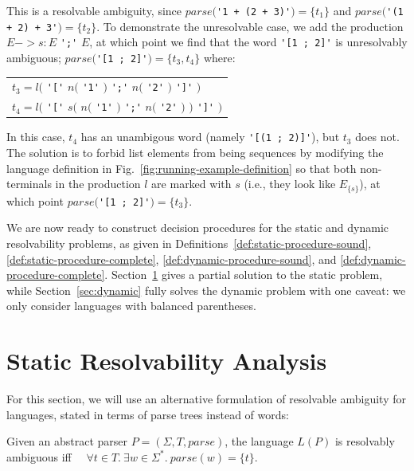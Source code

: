 \documentclass[acmsmall,review,anonymous]{acmart}\settopmatter{printfolios=true,printccs=false,printacmref=false}
\newcommand{\T}{\Sigma} %
\newcommand{\parse}{\mathit{parse}} %
\begin{document}
\noindent This is a resolvable ambiguity, since $\parse($\verb|'1 + (2 + 3)'|$) = \{t_1\}$ and $\parse($\verb|'(1 + 2) + 3'|$) = \{t_2\}$. To demonstrate the unresolvable case, we add the production $E -> s: E$ \verb|';'| $E$, at which point we find that the word \verb|'[1 ; 2]'| is unresolvably ambiguous; $\parse($\verb|'[1 ; 2]'|$) = \{t_3, t_4\}$ where:

\begin{center}
  \begin{tabular}{l}
    $t_3 = l($ \verb|'['| \hphantom{$s($} $n($ \verb|'1'| $)$ \verb|';'| $n($ \verb|'2'| $)$ \hphantom{$)$} \verb|']'| $)$ \\
    $t_4 = l($ \verb|'['| $s($ $n($ \verb|'1'| $)$ \verb|';'| $n($ \verb|'2'| $)$ $)$ \verb|']'| $)$ \\
  \end{tabular}
\end{center}

\noindent In this case, $t_4$ has an unambigous word (namely \verb|'[(1 ; 2)]'|), but $t_3$ does not. The solution is to forbid list elements from being sequences by modifying the language definition in Fig.~\ref{fig:running-example-definition} so that both non-terminals in the production $l$ are marked with $s$ (i.e., they look like $E_{\{s\}}$), at which point $\parse($\verb|'[1 ; 2]'|$) = \{t_3\}$.

We are now ready to construct decision procedures for the static and dynamic resolvability problems, as given in Definitions~\ref{def:static-procedure-sound}, \ref{def:static-procedure-complete}, \ref{def:dynamic-procedure-sound}, and \ref{def:dynamic-procedure-complete}. Section~\ref{sec:static} gives a partial solution to the static problem, while Section~\ref{sec:dynamic} fully solves the dynamic problem with one caveat: we only consider languages with balanced parentheses.

\section{Static Resolvability Analysis} \label{sec:static}

For this section, we will use an alternative formulation of resolvable ambiguity for languages, stated in terms of parse trees instead of words:

\begin{theorem}
  Given an abstract parser $P = (\T, T, \parse)$, the language $L(P)$ is resolvably ambiguous iff $\quad\forall t \in T.\ \exists w \in \T^{*}.\ \parse(w) = \{t\}$.
\end{theorem}
\end{document}
